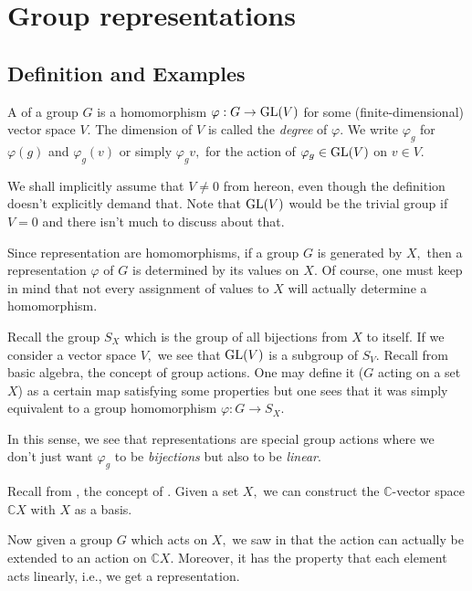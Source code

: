 \section{Group representations} \label{sec:01}

\subsection{Definition and Examples}
\begin{defn}%
	A  of a group $G$ is a homomorphism $\varphi:G\to \operatorname{GL}(V)$ for some (finite-dimensional) vector space $V.$ The dimension of $V$ is called the \emph{degree} of $\varphi.$ We write $\varphi_g$ for $\varphi(g)$ and $\varphi_g(v)$ or simply $\varphi_gv,$ for the action of $\varphi_g \in \operatorname{GL}(V)$ on $v \in V.$
\end{defn}

\begin{rem}
	We shall implicitly assume that $V \neq 0$ from hereon, even though the definition doesn't explicitly demand that. Note that $\operatorname{GL}(V)$ would be the trivial group if $V = 0$ and there isn't much to discuss about that.
\end{rem}

\begin{rem}
	Since representation are homomorphisms, if a group $G$ is generated by $X,$ then a representation $\varphi$ of $G$ is determined by its values on $X.$ Of course, one must keep in mind that not every assignment of values to $X$ will actually determine a homomorphism. 
\end{rem}

\begin{rem} \label{rem:groupaction}
	Recall the group $S_{X}$ which is the group of all bijections from $X$ to itself. If we consider a vector space $V,$ we see that $\operatorname{GL}(V)$ is a subgroup of $S_V.$ Recall from basic algebra, the concept of group actions. One may define it ($G$ acting on a set $X$) as a certain map satisfying some properties but one sees that it was simply equivalent to a group homomorphism $\varphi:G \to S_X.$ 

	In this sense, we see that representations are special group actions where we don't just want $\varphi_g$ to be \emph{bijections} but also to be \emph{linear}.
\end{rem}

\begin{ex}
	Recall from , the concept of . Given a set $X,$ we can construct the $\mathbb{C}$-vector space $\mathbb{C}X$ with $X$ as a basis.

	Now given a group $G$ which acts on $X,$ we saw in  that the action can actually be extended to an action on $\mathbb{C}X.$ Moreover, it has the property that each element acts linearly, i.e., we get a representation.
\end{ex}

